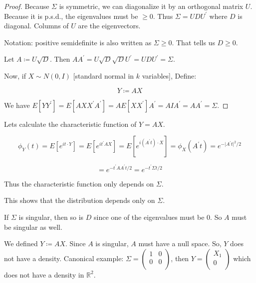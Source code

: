 \documentclass{article}
\theoremstyle{definition}
\begin{document}
\begin{proof}

    Because \(\Sigma\) is symmetric, we can diagonalize it by an orthogonal matrix \(U\). Because it is p.s.d., the eigenvalues must be \(\geq 0\). Thus \(\Sigma = U D U^{\prime} \) where \(D\) is diagonal. Columns of \(U\) are the eigenvectors.

    Notation: positive semidefinite is also written as \(\Sigma \geq 0\). That tells us \(D \geq 0\).

    Let \(A \coloneqq U \sqrt{D}\). Then \(A A^{\prime} = U \sqrt{D} \sqrt{D} U^{\prime} = U D U^{\prime} = \Sigma\).

    Now, if \(X\sim N(0,I)\) [standard normal in \(k\) variables], Define:

    \[
        \boxed{Y \coloneqq A X}
    \]

    We have \(E[Y Y^{\prime} ] = E[A X X^{\prime} A^{\prime} ] = A E[X X^{\prime} ] A^{\prime} = A I A^{\prime} = A A^{\prime} = \Sigma\).

\end{proof}

Lets calculate the characteristic function of \(Y = AX\).

\[
    \phi_Y(t) = E[e^{it\cdot Y}] = E[e^{i t^{\prime} A X}] = E[e^{i (A^{\prime} t)\cdot X}] = \phi_X(A^{\prime} t) = e^{- \vert A^{\prime} t \vert ^2 / 2}
\]

\[
    = e^{- t^{\prime} A A^{\prime} t / 2} = \boxed{e^{- t^{\prime} \Sigma t / 2}}
\]

Thus the characteristic function only depends on \(\Sigma\).

This shows that the distribution depends only on \(\Sigma\).

If \(\Sigma\) is singular, then so is \(D\) since one of the eigenvalues must be \(0\). So \(A\) must be singular as well.

We defined \(Y \coloneqq AX\). Since \(A\)  is singular, \(A\) must have a null space. So, \(Y\) does not have a density. Canonical example: \(\Sigma = \begin{pmatrix}
    1 &  0 \\
    0 &  0 \\
\end{pmatrix}\), then \(Y = \begin{pmatrix}
     X_1 \\
     0 \\
\end{pmatrix}\) which does not have a density in \(\mathbb{R}^2\).
\end{document}
